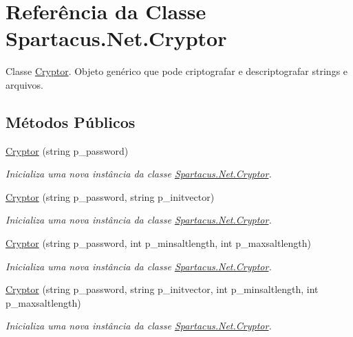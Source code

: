 \hypertarget{classSpartacus_1_1Net_1_1Cryptor}{\section{Referência da Classe Spartacus.\+Net.\+Cryptor}
\label{classSpartacus_1_1Net_1_1Cryptor}
}


Classe \hyperlink{classSpartacus_1_1Net_1_1Cryptor}{Cryptor}. Objeto genérico que pode criptografar e descriptografar strings e arquivos.  


\subsection*{Métodos Públicos}
\begin{DoxyCompactItemize}
\item 
\hyperlink{classSpartacus_1_1Net_1_1Cryptor_a5c76a4b6b5815664fb8eae9a3f609ff7}{Cryptor} (string p\+\_\+password)
\begin{DoxyCompactList}\small\item\em Inicializa uma nova instância da classe \hyperlink{classSpartacus_1_1Net_1_1Cryptor}{Spartacus.\+Net.\+Cryptor}. \end{DoxyCompactList}\item 
\hyperlink{classSpartacus_1_1Net_1_1Cryptor_a8d4320e54c937dea7ed97d37efdc68a5}{Cryptor} (string p\+\_\+password, string p\+\_\+initvector)
\begin{DoxyCompactList}\small\item\em Inicializa uma nova instância da classe \hyperlink{classSpartacus_1_1Net_1_1Cryptor}{Spartacus.\+Net.\+Cryptor}. \end{DoxyCompactList}\item 
\hyperlink{classSpartacus_1_1Net_1_1Cryptor_aad82c26437402976596842bbf56f67a3}{Cryptor} (string p\+\_\+password, int p\+\_\+minsaltlength, int p\+\_\+maxsaltlength)
\begin{DoxyCompactList}\small\item\em Inicializa uma nova instância da classe \hyperlink{classSpartacus_1_1Net_1_1Cryptor}{Spartacus.\+Net.\+Cryptor}. \end{DoxyCompactList}\item 
\hyperlink{classSpartacus_1_1Net_1_1Cryptor_a819d80d2a1716d595f86606eff2c274a}{Cryptor} (string p\+\_\+password, string p\+\_\+initvector, int p\+\_\+minsaltlength, int p\+\_\+maxsaltlength)
\begin{DoxyCompactList}\small\item\em Inicializa uma nova instância da classe \hyperlink{classSpartacus_1_1Net_1_1Cryptor}{Spartacus.\+Net.\+Cryptor}. \end{DoxyCompactList}\item 

\end{DoxyCompactItemize}
